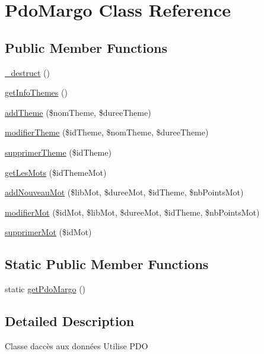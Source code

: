 \hypertarget{class_pdo_margo}{}\section{Pdo\+Margo Class Reference}
\label{class_pdo_margo}
\subsection*{Public Member Functions}
\begin{DoxyCompactItemize}
\item 
\hyperlink{class_pdo_margo_a1c6024f681d3956654622d9f28e540a2}{\+\_\+destruct} ()
\item 
\hyperlink{class_pdo_margo_af277c3044441874c9a80ea2c1ef3c2b0}{get\+Info\+Themes} ()
\item 
\hyperlink{class_pdo_margo_a70af54691903b1f4a89089085db8a34e}{add\+Theme} (\$nom\+Theme, \$duree\+Theme)
\item 
\hyperlink{class_pdo_margo_ac193e3bdb93b74257d5736c1b977d8bb}{modifier\+Theme} (\$id\+Theme, \$nom\+Theme, \$duree\+Theme)
\item 
\hyperlink{class_pdo_margo_add979bea294fd8dedb009c13cef67853}{supprimer\+Theme} (\$id\+Theme)
\item 
\hyperlink{class_pdo_margo_aecf5181e5b261e14d7ae2db7e80f4b03}{get\+Les\+Mots} (\$id\+Theme\+Mot)
\item 
\hyperlink{class_pdo_margo_a101a1daa7953ba9e395b7d536114cff6}{add\+Nouveau\+Mot} (\$lib\+Mot, \$duree\+Mot, \$id\+Theme, \$nb\+Points\+Mot)
\item 
\hyperlink{class_pdo_margo_ac9923701a6831fbad9aad74606cbc236}{modifier\+Mot} (\$id\+Mot, \$lib\+Mot, \$duree\+Mot, \$id\+Theme, \$nb\+Points\+Mot)
\item 
\hyperlink{class_pdo_margo_a215827d5589d39299e14d1ffcef0d137}{supprimer\+Mot} (\$id\+Mot)
\end{DoxyCompactItemize}
\subsection*{Static Public Member Functions}
\begin{DoxyCompactItemize}
\item 
static \hyperlink{class_pdo_margo_ab1f38545bf98095f454b747fbc937167}{get\+Pdo\+Margo} ()
\end{DoxyCompactItemize}


\subsection{Detailed Description}
Classe d\textquotesingle{}accès aux données Utilise P\+D\+O


